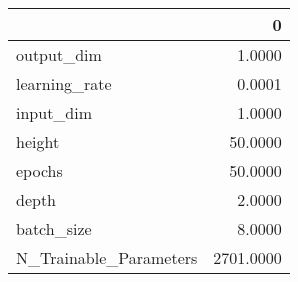 \begin{tabular}{lr}
\toprule
{} &          0 \\
\midrule
output\_dim             &     1.0000 \\
learning\_rate          &     0.0001 \\
input\_dim              &     1.0000 \\
height                 &    50.0000 \\
epochs                 &    50.0000 \\
depth                  &     2.0000 \\
batch\_size             &     8.0000 \\
N\_Trainable\_Parameters &  2701.0000 \\
\bottomrule
\end{tabular}

